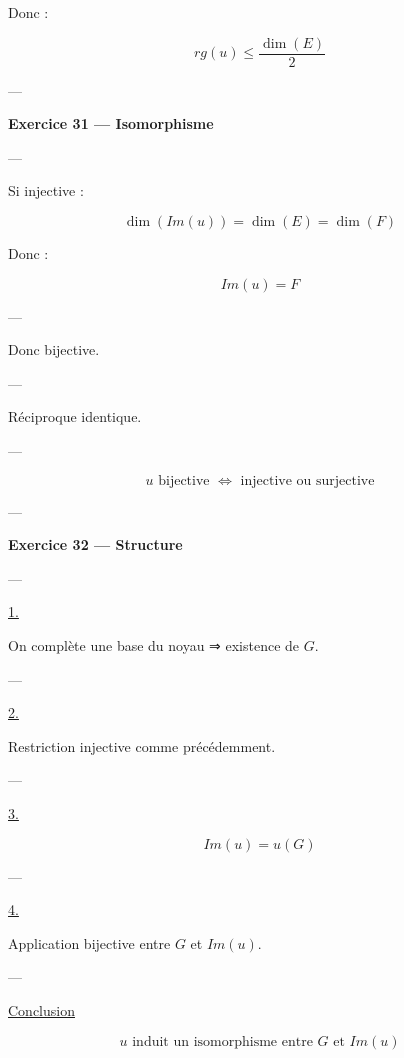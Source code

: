 \documentclass[11pt,a4paper]{article}
\begin{document}
Donc :

\[
rg(u)\leq \frac{\dim(E)}{2}
\]

---

\textbf{Exercice 31 — Isomorphisme}

---

Si injective :

\[
\dim(Im(u))=\dim(E)=\dim(F)
\]

Donc :

\[
Im(u)=F
\]

---

Donc bijective.

---

Réciproque identique.

---

\[
\boxed{u \text{ bijective } \Longleftrightarrow \text{ injective ou surjective}}
\]

---

\textbf{Exercice 32 — Structure}

---

\underline{1.}

On complète une base du noyau ⇒ existence de $G$.

---

\underline{2.}

Restriction injective comme précédemment.

---

\underline{3.}

\[
Im(u)=u(G)
\]

---

\underline{4.}

Application bijective entre $G$ et $Im(u)$.

---

\underline{Conclusion}

\[
\boxed{u \text{ induit un isomorphisme entre } G \text{ et } Im(u)}
\]
\end{document}
